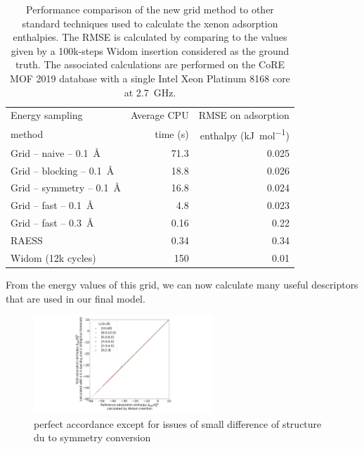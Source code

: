 \documentclass[main]{subfiles}
\begin{document}
\setlength{\extrarowheight}{0.1cm}
\begin{table}[ht]
    \begin{tabular}{|l|r|r|}
        \hline
        Energy sampling  &  Average CPU & RMSE on adsorption  \\
        method &  time (s)  &  enthalpy (\si{\kilo\joule\per\mole}) \\[0.5mm]
        \hline
        Grid -- naive -- \SI{0.1}{\angstrom} &  71.3 & 0.025  \\[0.5mm]
        Grid -- blocking -- \SI{0.1}{\angstrom} &  18.8 & 0.026  \\
        Grid -- symmetry -- \SI{0.1}{\angstrom} &  16.8 & 0.024  \\
        Grid -- fast -- \SI{0.1}{\angstrom} &  4.8 & 0.023  \\
        Grid -- fast -- \SI{0.3}{\angstrom} &  0.16 & 0.22  \\
        RAESS\cite{Ren_2023}  &  0.34 & 0.34  \\
        Widom\cite{Widom1963} (12k cycles) &  150 & 0.01  \\
        \hline
    \end{tabular}
    \caption{Performance comparison of the new grid method to other standard techniques used to calculate the xenon adsorption enthalpies. The RMSE is calculated by comparing to the values given by a 100k-steps Widom insertion considered as the ground truth. The associated calculations are performed on the CoRE MOF 2019 database with a single Intel Xeon Platinum 8168 core at 2.7~GHz.}\label{tab:grid}
\end{table}

From the energy values of this grid, we can now calculate many useful descriptors that are used in our final model. 

\begin{figure}[ht]
  \centering
    \includegraphics[width=0.6\textwidth]{figures/3-fastsim/H_Xe_widom_vs_H_Xe_grid_overview.jpg}
    \caption{perfect accordance except for issues of small difference of structure du to symmetry conversion}\label{fgr:grid_widom}
\end{figure}
\end{document}
